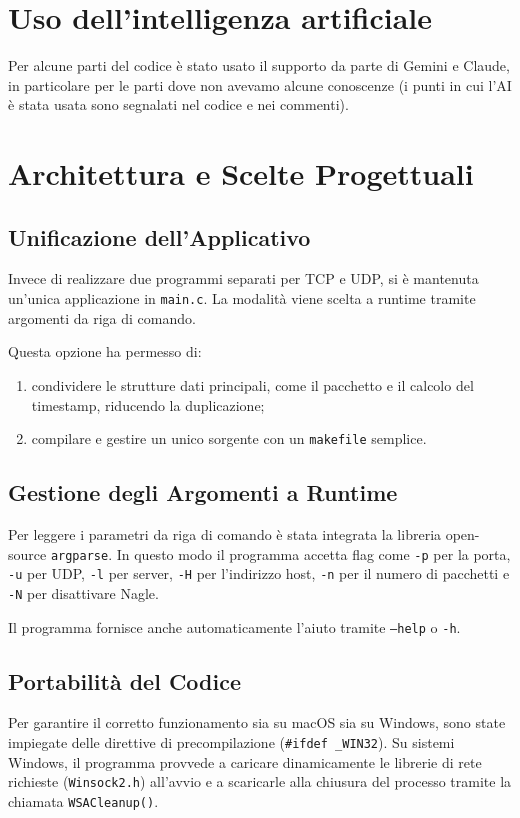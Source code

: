 \documentclass[12pt,a4paper,oneside]{article}
\begin{document}
\section{Uso dell'intelligenza artificiale}
Per alcune parti del codice è stato usato il supporto da parte di Gemini e Claude, in particolare per le parti dove non avevamo alcune conoscenze (i punti in cui l'AI è stata usata sono segnalati nel codice e nei commenti).

\section{Architettura e Scelte Progettuali}

\subsection{Unificazione dell'Applicativo}
Invece di realizzare due programmi separati per TCP e UDP, si è mantenuta un'unica applicazione in \texttt{main.c}. La modalità viene scelta a runtime tramite argomenti da riga di comando.

Questa opzione ha permesso di:
\begin{enumerate}
    \item condividere le strutture dati principali, come il pacchetto e il calcolo del timestamp, riducendo la duplicazione;
    \item compilare e gestire un unico sorgente con un \texttt{makefile} semplice.
\end{enumerate}

\subsection{Gestione degli Argomenti a Runtime}
Per leggere i parametri da riga di comando è stata integrata la libreria open-source \texttt{argparse}. In questo modo il programma accetta flag come \texttt{-p} per la porta, \texttt{-u} per UDP, \texttt{-l} per server, \texttt{-H} per l'indirizzo host, \texttt{-n} per il numero di pacchetti e \texttt{-N} per disattivare Nagle.

Il programma fornisce anche automaticamente l'aiuto tramite \texttt{--help} o \texttt{-h}.

\subsection{Portabilità del Codice}
Per garantire il corretto funzionamento sia su macOS sia su Windows, sono state impiegate delle direttive di precompilazione (\texttt{\#ifdef \_WIN32}). Su sistemi Windows, il programma provvede a caricare dinamicamente le librerie di rete richieste (\texttt{Winsock2.h}) all'avvio e a scaricarle alla chiusura del processo tramite la chiamata \texttt{WSACleanup()}.
\end{document}
